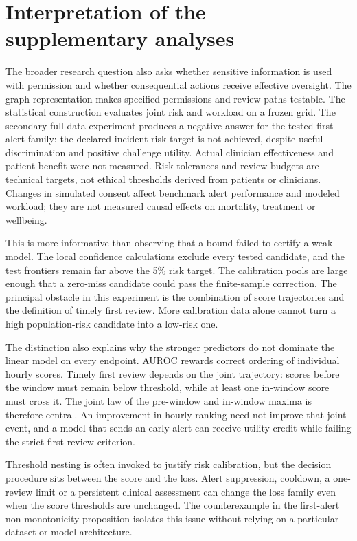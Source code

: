 \section*{Interpretation of the supplementary analyses}

The broader research question also asks whether sensitive information is used with permission and whether consequential actions receive effective oversight. The graph representation makes specified permissions and review paths testable. The statistical construction evaluates joint risk and workload on a frozen grid. The secondary full-data experiment produces a negative answer for the tested first-alert family: the declared incident-risk target is not achieved, despite useful discrimination and positive challenge utility. Actual clinician effectiveness and patient benefit were not measured. Risk tolerances and review budgets are technical targets, not ethical thresholds derived from patients or clinicians. Changes in simulated consent affect benchmark alert performance and modeled workload; they are not measured causal effects on mortality, treatment or wellbeing.

This is more informative than observing that a bound failed to certify a weak model. The local confidence calculations exclude every tested candidate, and the test frontiers remain far above the 5\% risk target. The calibration pools are large enough that a zero-miss candidate could pass the finite-sample correction. The principal obstacle in this experiment is the combination of score trajectories and the definition of timely first review. More calibration data alone cannot turn a high population-risk candidate into a low-risk one.

The distinction also explains why the stronger predictors do not dominate the linear model on every endpoint. AUROC rewards correct ordering of individual hourly scores. Timely first review depends on the joint trajectory: scores before the window must remain below threshold, while at least one in-window score must cross it. The joint law of the pre-window and in-window maxima is therefore central. An improvement in hourly ranking need not improve that joint event, and a model that sends an early alert can receive utility credit while failing the strict first-review criterion.

Threshold nesting is often invoked to justify risk calibration, but the decision procedure sits between the score and the loss. Alert suppression, cooldown, a one-review limit or a persistent clinical assessment can change the loss family even when the score thresholds are unchanged. The counterexample in the first-alert non-monotonicity proposition isolates this issue without relying on a particular dataset or model architecture.

